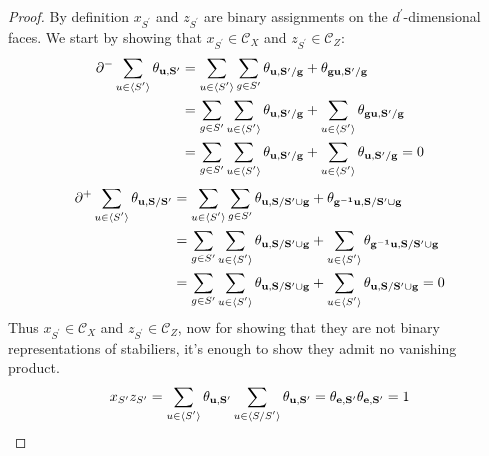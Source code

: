 \begin{proof}
  By definition $x_{S^{\prime}}$ and $z_{S^{\prime}}$ are binary assignments on the $d^{\prime}$-dimensional faces. We start by showing that $x_{S^{\prime}} \in \mathcal{C}_{X}$ and $z_{S^{\prime}}\in \mathcal{C}_{Z}$: 
\begin{equation*}
  \begin{split}
    \partial^{-} \sum_{u \in \expval*{S^{\prime}} }\mathbf{\theta_{u ,S^{\prime}} } &=  \sum_{u \in \expval*{S^{\prime}} } \sum_{g\in S^{\prime}} \mathbf{\theta_{ u ,S^{\prime}/g} } +  \mathbf{\theta_{gu ,S^{\prime}/g} } \\
     &=  \sum_{g\in S^{\prime}} \sum_{u \in \expval*{S^{\prime}} } \mathbf{\theta_{ u ,S^{\prime}/g} } +  \sum_{u \in \expval*{S^{\prime}} }\mathbf{\theta_{gu ,S^{\prime}/g} } \\
     &=  \sum_{g\in S^{\prime}} \sum_{u \in \expval*{S^{\prime}} } \mathbf{\theta_{ u ,S^{\prime}/g} } +  \sum_{u \in \expval*{S^{\prime}} }\mathbf{\theta_{u ,S^{\prime}/g} } = 0 
  \end{split}
\end{equation*}
\begin{equation*}
  \begin{split}
    \partial^{+} \sum_{u \in \expval*{S^{\prime}} }\mathbf{\theta_{u ,S/S^{\prime}} } &=  \sum_{u \in \expval*{S^{\prime}} } \sum_{g\in S^{\prime}} \mathbf{\theta_{ u ,S/S^{\prime} \cup g} } +  \mathbf{\theta_{g^{-1} u ,S/S^{\prime} \cup g} } \\
    &=  \sum_{g\in S^{\prime}} \sum_{u \in \expval*{S^{\prime}} } \mathbf{\theta_{ u ,S/S^{\prime} \cup g} } +  \sum_{u \in \expval*{S^{\prime}} }\mathbf{\theta_{g^{-1}u ,S/S^{\prime}\cup g} } \\
     &=  \sum_{g\in S^{\prime}} \sum_{u \in \expval*{S^{\prime}} } \mathbf{\theta_{ u ,S/S^{\prime}\cup g} } +  \sum_{u \in \expval*{S^{\prime}} }\mathbf{\theta_{u ,S/S^{\prime} \cup g} } = 0 
  \end{split}
\end{equation*}
Thus $x_{S^{\prime}} \in \mathcal{C}_{X}$ and $z_{S^{\prime}}\in \mathcal{C}_{Z}$, now for showing that they are not binary representations of stabiliers, it's enough to show they admit no vanishing product.  
\begin{equation*}
  \begin{split}
    x_{S^{\prime}}z_{S^{\prime}} = \sum_{u \in \expval*{S^{\prime}} }\mathbf{\theta_{u ,S^{\prime}} } \sum_{u \in \expval*{S/S^{\prime}} }\mathbf{\theta_{u ,S^{\prime}} } = \mathbf{\theta_{e ,S^{\prime}} } \mathbf{\theta_{e ,S^{\prime}} } = 1
  \end{split}
\end{equation*}
\end{proof}
